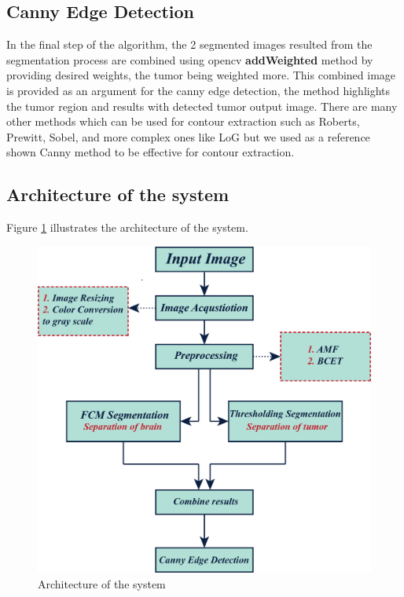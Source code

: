 \subsection{Canny Edge Detection}
In the final step of the algorithm, the 2 segmented images resulted from the segmentation process are combined using opencv \textbf{addWeighted} method by providing desired weights, the tumor being weighted more. This combined image is provided as an argument for the canny edge detection, the method highlights the tumor region and results with detected tumor output image.
There are many other methods which can be used for contour extraction such as Roberts, Prewitt, Sobel, and more complex ones like LoG but we used as a reference shown Canny method to be effective for contour extraction.

\subsection{Architecture of the system}
Figure \ref{fig29} illustrates the architecture of the system.

\newpage
\begin{figure}[H]
	\centering \includegraphics[width=1\columnwidth]{figures/Fig29.png}
	\caption{Architecture of the system}
	\label{fig29}
\end{figure}

